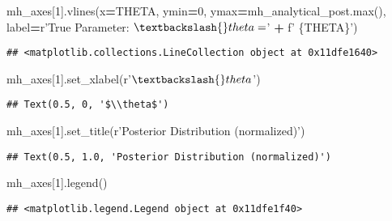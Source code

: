 \documentclass[]{article}
\newenvironment{Shaded}{\begin{snugshade}}{\end{snugshade}}
\newcommand{\BuiltInTok}[1]{#1}
\newcommand{\DecValTok}[1]{\textcolor[rgb]{0.00,0.00,0.81}{#1}}
\newcommand{\NormalTok}[1]{#1}
\newcommand{\OperatorTok}[1]{\textcolor[rgb]{0.81,0.36,0.00}{\textbf{#1}}}
\newcommand{\SpecialCharTok}[1]{\textcolor[rgb]{0.00,0.00,0.00}{#1}}
\newcommand{\SpecialStringTok}[1]{\textcolor[rgb]{0.31,0.60,0.02}{#1}}
\newcommand{\VerbatimStringTok}[1]{\textcolor[rgb]{0.31,0.60,0.02}{#1}}
\begin{document}
\begin{Shaded}
\begin{Highlighting}[]
\NormalTok{mh_axes[}\DecValTok{1}\NormalTok{].vlines(x}\OperatorTok{=}\NormalTok{THETA, ymin}\OperatorTok{=}\DecValTok{0}\NormalTok{, ymax}\OperatorTok{=}\NormalTok{mh_analytical_post.}\BuiltInTok{max}\NormalTok{(),}
\NormalTok{                  label}\OperatorTok{=}\VerbatimStringTok{r'True Parameter: $\textbackslash{}theta =$'} \OperatorTok{+} \SpecialStringTok{f' }\SpecialCharTok{\{}\NormalTok{THETA}\SpecialCharTok{\}}\SpecialStringTok{'}\NormalTok{)}
\end{Highlighting}
\end{Shaded}

\begin{verbatim}
## <matplotlib.collections.LineCollection object at 0x11dfe1640>
\end{verbatim}

\begin{Shaded}
\begin{Highlighting}[]
\NormalTok{mh_axes[}\DecValTok{1}\NormalTok{].set_xlabel(}\VerbatimStringTok{r'$\textbackslash{}theta$'}\NormalTok{)}
\end{Highlighting}
\end{Shaded}

\begin{verbatim}
## Text(0.5, 0, '$\\theta$')
\end{verbatim}

\begin{Shaded}
\begin{Highlighting}[]
\NormalTok{mh_axes[}\DecValTok{1}\NormalTok{].set_title(}\VerbatimStringTok{r'Posterior Distribution (normalized)'}\NormalTok{)}
\end{Highlighting}
\end{Shaded}

\begin{verbatim}
## Text(0.5, 1.0, 'Posterior Distribution (normalized)')
\end{verbatim}

\begin{Shaded}
\begin{Highlighting}[]
\NormalTok{mh_axes[}\DecValTok{1}\NormalTok{].legend()}
\end{Highlighting}
\end{Shaded}

\begin{verbatim}
## <matplotlib.legend.Legend object at 0x11dfe1f40>
\end{verbatim}
\end{document}

